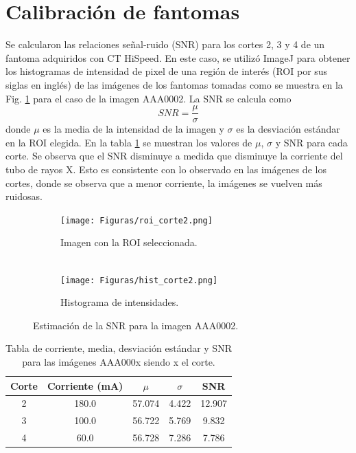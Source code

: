 \documentclass[11pt,twocolumn,twoside]{opticajnl}
\begin{document}
\section{Calibración de fantomas\label{sec:ej7}}

\vspace{0.3cm}

Se calcularon las relaciones señal-ruido (SNR) para los cortes 2, 3 y 4 de un fantoma adquiridos con CT HiSpeed. En este caso, se utilizó ImageJ para obtener los histogramas de intensidad de pixel de una región de interés (ROI por sus siglas en inglés) de las imágenes de los fantomas tomadas como se muestra en la Fig. \ref{fig:SNR} para el caso de la imagen AAA0002. La SNR se calcula como 
\begin{equation}
    SNR = \frac{\mu}{\sigma}
\end{equation}
donde $\mu$ es la media de la intensidad de la imagen y $\sigma$ es la desviación estándar en la ROI elegida. En la tabla \ref{tab:SNR} se muestran los valores de $\mu$, $\sigma$ y SNR para cada corte. Se observa que el SNR disminuye a medida que disminuye la corriente del tubo de rayos X. Esto es consistente con lo observado en las imágenes de los cortes, donde se observa que a menor corriente, la imágenes se vuelven más ruidosas.

\begin{figure}[h]
    \centering
         \begin{subfigure}[h]{0.49\linewidth}
            \centering
            \texttt{[image: Figuras/roi\_corte2.png]}
            \caption{Imagen con la ROI seleccionada. \\
            $~$} 
         \end{subfigure}
         \begin{subfigure}[h]{0.49\linewidth}
            \centering
            \texttt{[image: Figuras/hist\_corte2.png]}
            \caption{Histograma de intensidades.}
         \end{subfigure}
    \caption{Estimación de la SNR para la imagen AAA0002.}
    \label{fig:SNR}
\end{figure}

\begin{table}[h]
    \centering
    \begin{tabular}{c||c|c|c|c}
    \hline
    Corte & Corriente (mA) & $\mu$     & $\sigma$ & SNR \\ \hline
    2     & 180.0          & 57.074 & 4.422 & 12.907   \\ \hline
    3     & 100.0          & 56.722 & 5.769 & 9.832   \\ \hline
    4     & 60.0           & 56.728 & 7.286 & 7.786   \\ \hline
    \end{tabular}
    \caption{Tabla de corriente, media, desviación estándar y SNR para las imágenes AAA000x siendo x el corte.} \label{tab:SNR}
\end{table}
\end{document}
